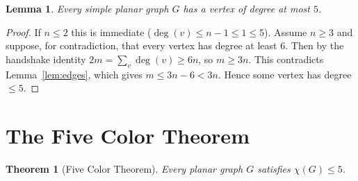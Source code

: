 \documentclass{amsart}
\newtheorem{theorem}{Theorem}
\newtheorem{lemma}{Lemma}
\theoremstyle{remark}
\begin{document}
\begin{lemma}\label{lem:mindeg}
Every simple planar graph $G$ has a vertex of degree at most $5$.
\end{lemma}

\begin{proof}
If $n\le2$ this is immediate ($\deg(v)\le n-1\le1\le5$). Assume $n\ge3$ and
suppose, for contradiction, that every vertex has degree at least $6$. Then by the
handshake identity $2m=\sum_{v}\deg(v)\ge 6n$, so $m\ge 3n$. This contradicts
Lemma~\ref{lem:edges}, which gives $m\le 3n-6<3n$. Hence some vertex has degree
$\le5$.
\end{proof}

\section{The Five Color Theorem}

\begin{theorem}[Five Color Theorem]\label{thm:five}
Every planar graph $G$ satisfies $\chi(G)\le 5$.
\end{theorem}
\end{document}
